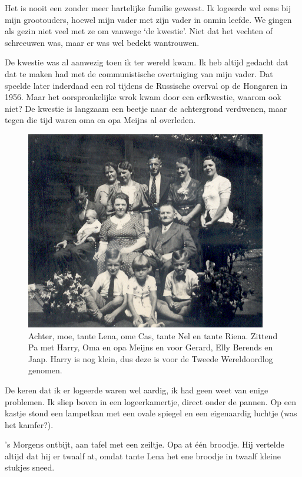 \documentclass[12pt,twoside]{memoir}
\begin{document}
Het is nooit een zonder meer hartelijke familie geweest. Ik logeerde wel eens bij mijn grootouders, hoewel mijn vader met zijn vader in onmin leefde. We gingen als gezin niet veel met ze om vanwege `de kwestie'. Niet dat het vechten of schreeuwen was, maar er was wel bedekt wantrouwen.

De kwestie was al aanwezig toen ik ter wereld kwam. Ik heb altijd gedacht dat dat te maken had met de communistische overtuiging van mijn vader. Dat speelde later inderdaad een rol tijdens de Russische overval op de Hongaren in 1956. Maar het oorspronkelijke wrok kwam door een erfkwestie, waarom ook niet? De kwestie is langzaam een beetje naar de achtergrond verdwenen, maar tegen die tijd waren oma en opa Meijns al overleden.

\begin{figure}[t]
\includegraphics[width=\textwidth]{img/ch1/famMeijns2}
\caption*{\footnotesize Achter, moe, tante Lena, ome Cas, tante Nel en tante Riena. Zittend Pa met Harry, Oma en opa Meijns en voor Gerard, Elly Berends en Jaap. Harry is nog klein, dus deze is voor de Tweede Wereldoordlog genomen.}
\end{figure}

De keren dat ik er logeerde waren wel aardig, ik had geen weet van enige problemen. Ik sliep boven in een logeerkamertje, direct onder de pannen. Op een kastje stond een lampetkan met een ovale spiegel en een eigenaardig luchtje (was het kamfer?). 

’s Morgens ontbijt, aan tafel met een zeiltje. Opa at één broodje. Hij vertelde altijd dat hij er twaalf at, omdat tante Lena het ene broodje in twaalf kleine stukjes sneed. 
\end{document}
